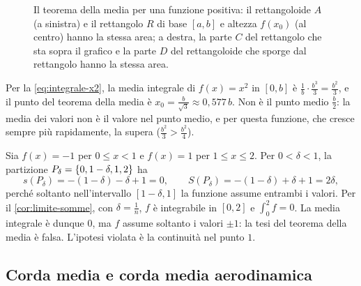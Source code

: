 \begin{figure}[htb]
\caption{Il teorema della media per una funzione positiva: il rettangoloide $A$ (a
sinistra) e il rettangolo $R$ di base $[a,b]$ e altezza $f(x_{0})$ (al centro) hanno la
stessa area; a destra, la parte $C$ del rettangolo che sta sopra il grafico e la parte
$D$ del rettangoloide che sporge dal rettangolo hanno la stessa area.}
\label{fig:media}
\end{figure}

\begin{esempio}[Media di $x^{2}$]\label{es:media-x2}
Per la \eqref{eq:integrale-x2}, la media integrale di $f(x)=x^{2}$ in $[0,b]$ è
$\frac1b\cdot\frac{b^{3}}3=\frac{b^{2}}3$, e il punto del teorema della media è
$x_{0}=\frac b{\sqrt3}\approx0{,}577\,b$. Non è il punto medio $\frac b2$: la media dei
valori non è il valore nel punto medio, e per questa funzione, che cresce sempre più
rapidamente, la supera ($\frac{b^{2}}3>\frac{b^{2}}4$).
\end{esempio}

\begin{osservazione}\label{oss:media-discontinua}
Sia $f(x)=-1$ per $0\le x<1$ e $f(x)=1$ per $1\le x\le2$. Per $0<\delta<1$, la
partizione $P_{\delta}=\left\{ 0,1-\delta,1,2 \right\}$ ha
\[
  s(P_{\delta})=-(1-\delta)-\delta+1=0, \qquad S(P_{\delta})=-(1-\delta)+\delta+1=2\delta ,
\]
perché soltanto nell'intervallo $[1-\delta,1]$ la funzione assume entrambi i valori. Per
il \cref{cor:limite-somme}, con $\delta=\frac1n$, $f$ è integrabile in $[0,2]$ e
$\int_{0}^{2}f=0$. La media integrale è dunque $0$, ma $f$ assume soltanto i valori
$\pm1$: la tesi del teorema della media è falsa. L'ipotesi violata è la continuità nel
punto $1$.
\end{osservazione}

\subsection{Corda media e corda media aerodinamica}

